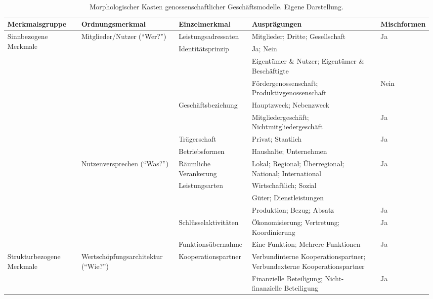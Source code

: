 \begin{sidewaystable}[htbp]
\centering
\small
\setlength{\tabcolsep}{4pt}
\renewcommand{\arraystretch}{1.3}
\caption{Morphologischer Kasten genossenschaftlicher Geschäftsmodelle. Eigene Darstellung.}
\label{tab:morphologischer_kasten}
\begin{tabularx}{\textwidth}{|p{}|p{}|p{}|X|p{}|}
\hline
\textbf{Merkmalsgruppe} & \textbf{Ordnungsmerkmal} & \textbf{Einzelmerkmal} & \textbf{Ausprägungen} & \textbf{Mischformen} \\
\hline
\multirow{14}{*}{Sinnbezogene Merkmale} & \multirow{8}{*}{Mitglieder/Nutzer (\enquote{Wer?})} & Leistungsadressaten & Mitglieder; Dritte; Gesellschaft & Ja \\
\cline{3-5}
 &  & Identit\"atsprinzip & Ja; Nein\\[-2pt]
 &  &  & Eigent\"umer \& Nutzer; Eigent\"umer \& Besch\"aftigte\\[-2pt]
 &  &  & F\"ordergenossenschaft; Produktivgenossenschaft & Nein \\
\cline{3-5}
 &  & Gesch\"aftsbeziehung & Hauptzweck; Nebenzweck\\[-2pt]
 &  &  & Mitgliedergesch\"aft; Nichtmitgliedergesch\"aft & Ja \\
\cline{3-5}
 &  & Tr\"agerschaft & Privat; Staatlich & Ja \\
\cline{3-5}
 &  & Betriebsformen & Haushalte; Unternehmen &  \\
\cline{2-5}
 & \multirow{6}{*}{Nutzenversprechen (\enquote{Was?})} & R\"aumliche Verankerung & Lokal; Regional; \"Uberregional; National; International & Ja \\
\cline{3-5}
 &  & Leistungsarten & Wirtschaftlich; Sozial\\[-2pt]
 &  &  & G\"uter; Dienstleistungen\\[-2pt]
 &  &  & Produktion; Bezug; Absatz & Ja \\
\cline{3-5}
 &  & Schl\"usselaktivit\"aten & \"Okonomisierung; Vertretung; Koordinierung & Ja \\
\cline{3-5}
 &  & Funktions\"ubernahme & Eine Funktion; Mehrere Funktionen & Ja \\
\hline
\multirow{10}{*}{Strukturbezogene Merkmale} & \multirow{6}{*}{Wertsch\"opfungsarchitektur (\enquote{Wie?})} & Kooperationspartner & Verbundinterne Kooperationspartner; Verbundexterne Kooperationspartner\\[-2pt]
 &  &  & Finanzielle Beteiligung; Nicht-finanzielle Beteiligung & Ja \\

\end{tabularx}
\end{sidewaystable}
